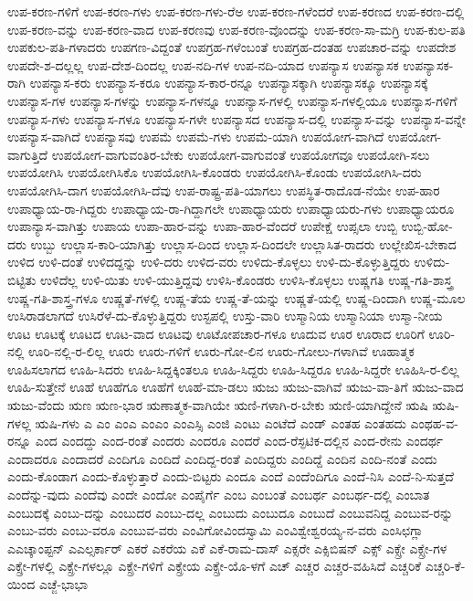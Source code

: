 {ಉಪ-ಕರಣ-ಗಳಿಗೆ
ಉಪ-ಕರಣ-ಗಳು
ಉಪ-ಕರಣ-ಗಳು-ರೆಅ
ಉಪ-ಕರಣ-ಗಳೆಂದರೆ
ಉಪ-ಕರಣದ
ಉಪ-ಕರಣ-ದಲ್ಲಿ
ಉಪ-ಕರಣ-ವನ್ನು
ಉಪ-ಕರಣ-ವಾದ
ಉಪ-ಕರಣವು
ಉಪ-ಕರಣ-ವೊಂದನ್ನು
ಉಪ-ಕರಣ-ಸಾ-ಮಗ್ರಿ
ಉಪ-ಕುಲ-ಪತಿ
ಉಪಕುಲ-ಪತಿ-ಗಳಾದರು
ಉಪಗಣ-ವಿದ್ದಂತೆ
ಉಪಗ್ರಹ-ಗಳೆಂಬಂತೆ
ಉಪಗ್ರಹ-ದಂತಹ
ಉಪಚಾರ-ವನ್ನು
ಉಪದೇಶ
ಉಪದೇ-ಶ-ದಲ್ಲಲ್ಲ
ಉಪ-ದೇಶ-ದಿಂದಲ್ಲ
ಉಪ-ನದಿ-ಗಳ
ಉಪ-ನದಿ-ಯಾದ
ಉಪನ್ಯಾಸ
ಉಪನ್ಯಾಸಕ
ಉಪನ್ಯಾಸಕ-ರಾಗಿ
ಉಪನ್ಯಾಸ-ಕರು
ಉಪನ್ಯಾಸ-ಕರೂ
ಉಪನ್ಯಾಸ-ಕಾರ-ರನ್ನೂ
ಉಪನ್ಯಾಸಕ್ಕಾಗಿ
ಉಪನ್ಯಾಸಕ್ಕೂ
ಉಪನ್ಯಾಸಕ್ಕೆ
ಉಪನ್ಯಾಸ-ಗಳ
ಉಪನ್ಯಾಸ-ಗಳನ್ನು
ಉಪನ್ಯಾಸ-ಗಳನ್ನೂ
ಉಪನ್ಯಾಸ-ಗಳಲ್ಲಿ
ಉಪನ್ಯಾಸ-ಗಳಲ್ಲಿಯೂ
ಉಪನ್ಯಾಸ-ಗಳಿಗೆ
ಉಪನ್ಯಾಸ-ಗಳು
ಉಪನ್ಯಾಸ-ಗಳೂ
ಉಪನ್ಯಾಸ-ಗಳೇ
ಉಪನ್ಯಾಸದ
ಉಪನ್ಯಾಸ-ದಲ್ಲಿ
ಉಪನ್ಯಾಸ-ವನ್ನು
ಉಪನ್ಯಾಸ-ವನ್ನೇ
ಉಪನ್ಯಾಸ-ವಾಗಿದೆ
ಉಪನ್ಯಾಸವು
ಉಪಮೆ
ಉಪಮೆ-ಗಳು
ಉಪಮೆ-ಯಾಗಿ
ಉಪಯೋಗ-ವಾಗಿದೆ
ಉಪಯೋಗ-ವಾಗುತ್ತಿದೆ
ಉಪಯೋಗ-ವಾಗುವಂತಿರ-ಬೇಕು
ಉಪಯೋಗ-ವಾಗುವಂತೆ
ಉಪಯೋಗವೂ
ಉಪಯೋಗಿ-ಸಲು
ಉಪಯೋಗಿಸಿ
ಉಪಯೋಗಿಸಿಕೊ
ಉಪಯೋಗಿಸಿ-ಕೊಂಡರು
ಉಪಯೋಗಿಸಿ-ಕೊಂಡು
ಉಪಯೋಗಿಸಿ-ದರು
ಉಪಯೋಗಿಸಿ-ದಾಗ
ಉಪಯೋಗಿಸಿ-ದೆವು
ಉಪ-ರಾಷ್ಟ್ರ-ಪತಿ-ಯಾಗಲು
ಉಪಸ್ಥಿತ-ರಾದೊಡ-ನೆಯೇ
ಉಪ-ಹಾರ
ಉಪಾಧ್ಯಾಯ-ರಾ-ಗಿದ್ದರು
ಉಪಾಧ್ಯಾಯ-ರಾ-ಗಿದ್ದಾಗಲೇ
ಉಪಾಧ್ಯಾಯರು
ಉಪಾಧ್ಯಾಯರು-ಗಳು
ಉಪಾಧ್ಯಾಯರೂ
ಉಪಾನ್ಯಾಸ-ವಾಗಿತ್ತು
ಉಪಾಯ
ಉಪಾ-ಹಾರ-ವನ್ನು
ಉಪಾ-ಹಾರ-ವೆಂದರೆ
ಉಪೇಕ್ಷೆ
ಉಪ್ಸಲಾ
ಉಬ್ಬಿ
ಉಬ್ಬಿ-ಹೋ-ದರು
ಉಬ್ಬು
ಉಲ್ಲಾಸ-ಕಾರಿ-ಯಾಗಿತ್ತು
ಉಲ್ಲಾಸ-ದಿಂದ
ಉಲ್ಲಾಸ-ದಿಂದಲೇ
ಉಲ್ಲಾಸಿತ-ರಾದರು
ಉಲ್ಲೇಖಿಸ-ಬೇಕಾದ
ಉಳಿದ
ಉಳಿ-ದಂತೆ
ಉಳಿದದ್ದನ್ನು
ಉಳಿ-ದರು
ಉಳಿದ-ವರು
ಉಳಿದು-ಕೊಳ್ಳಲು
ಉಳಿ-ದು-ಕೊಳ್ಳುತ್ತಿದ್ದರು
ಉಳಿದು-ಬಿಟ್ಟಿತು
ಉಳಿದೆಲ್ಲ
ಉಳಿ-ಯಿತು
ಉಳಿ-ಯುತ್ತಿದ್ದವು
ಉಳಿಸಿ-ಕೊಂಡರು
ಉಳಿಸಿ-ಕೊಳ್ಳಲು
ಉಷ್ಣಗತಿ
ಉಷ್ಣ-ಗತಿ-ಶಾಸ್ತ್ರ
ಉಷ್ಣ-ಗತಿ-ಶಾಸ್ತ್ರ-ಗಳೂ
ಉಷ್ಣತೆ-ಗಳಲ್ಲಿ
ಉಷ್ಣ-ತೆಯ
ಉಷ್ಣ-ತೆ-ಯನ್ನು
ಉಷ್ಣತೆ-ಯಲ್ಲಿ
ಉಷ್ಣ-ದಿಂದಾಗಿ
ಉಷ್ಣ-ಮೂಲ
ಉಸಿರಾಡಲಾಗದೆ
ಉಸಿರೆಳೆ-ದು-ಕೊಳ್ಳುತ್ತಿದ್ದರು
ಉಸ್ಟಪಲ್ಲಿ
ಉಸ್ತು-ವಾರಿ
ಉಸ್ಮಾನಿಯ
ಉಸ್ಮಾನಿಯಾ
ಉಸ್ಮಾ-ನೀಯ
ಊಟ
ಊಟಕ್ಕೆ
ಊಟದ
ಊಟ-ವಾದ
ಊಟವು
ಊಟೋಪಚಾರ-ಗಳೂ
ಊದುವ
ಊರ
ಊರಾದ
ಊರಿಗೆ
ಊರಿ-ನಲ್ಲಿ
ಊರಿ-ನಲ್ಲಿ-ರ-ಲಿಲ್ಲ
ಊರು
ಊರು-ಗಳಿಗೆ
ಊರು-ಗೋ-ಲಿನ
ಊರು-ಗೋಲು-ಗಳಾಗಿವೆ
ಊಹಾತ್ಮಕ
ಊಹಿಸಲಾಗದ
ಊಹಿ-ಸಿದರು
ಊಹಿ-ಸಿದ್ದಕ್ಕಿಂತಲೂ
ಊಹಿ-ಸಿದ್ದರು
ಊಹಿ-ಸಿದ್ದರೂ
ಊಹಿ-ಸಿದ್ದರೇ
ಊಹಿಸಿ-ರ-ಲಿಲ್ಲ
ಊಹಿ-ಸುತ್ತೇನೆ
ಊಹೆ
ಊಹೆಗೂ
ಊಹೆಗೆ
ಊಹೆ-ಮಾ-ಡಲು
ಋಜು
ಋಜು-ವಾಗಿವೆ
ಋಜು-ವಾ-ತಿಗೆ
ಋಜು-ವಾದ
ಋಜು-ವೆಂದು
ಋಣ
ಋಣ-ಭಾರ
ಋಣಾತ್ಮಕ-ವಾಗಿಯೇ
ಋಣಿ-ಗಳಾಗಿ-ರ-ಬೇಕು
ಋಣಿ-ಯಾಗಿದ್ದೇನೆ
ಋಷಿ
ಋಷಿ-ಗಳಲ್ಲ
ಋಷಿ-ಗಳು
ಎ
ಎಂ
ಎಂಎ
ಎಂಎಂ
ಎಂಎಸ್ಸಿ
ಎಂಜಿ
ಎಂಟು
ಎಂಟೆದೆ
ಎಂಡ್
ಎಂತಹ
ಎಂತಹದು
ಎಂಥಹ-ವ-ರನ್ನೂ
ಎಂದ
ಎಂದದ್ದು
ಎಂದ-ರಂತೆ
ಎಂದರು
ಎಂದರೂ
ಎಂದರೆ
ಎಂದ-ರೆಸ್ಫಟಿಕ-ದಲ್ಲಿನ
ಎಂದ-ರೇನು
ಎಂದರ್ಥ
ಎಂದಾದರೂ
ಎಂದಾದರೆ
ಎಂದಿಗೂ
ಎಂದಿದೆ
ಎಂದಿದ್ದ-ರಂತೆ
ಎಂದಿದ್ದರು
ಎಂದಿದ್ದೆ
ಎಂದಿನ
ಎಂದಿ-ನಂತೆ
ಎಂದು
ಎಂದು-ಕೊಂಡಾಗ
ಎಂದು-ಕೊಳ್ಳುತ್ತಾರೆ
ಎಂದು-ಬಿಟ್ಟರು
ಎಂದೂ
ಎಂದೆ
ಎಂದೆಂದಿಗೂ
ಎಂದೆ-ನಿಸಿ
ಎಂದೆ-ನಿ-ಸುತ್ತದೆ
ಎಂದೆನ್ನು-ವುದು
ಎಂದೆವು
ಎಂದೇ
ಎಂದೋ
ಎಂಪೈರ್ಗೆ
ಎಂಬ
ಎಂಬಂತೆ
ಎಂಬರ್ಥ
ಎಂಬರ್ಥ-ದಲ್ಲಿ
ಎಂಬಾತ
ಎಂಬುದಕ್ಕೆ
ಎಂಬು-ದನ್ನು
ಎಂಬುದರ
ಎಂಬು-ದಲ್ಲ
ಎಂಬುದು
ಎಂಬುದೂ
ಎಂಬುದೆ
ಎಂಬುವನಿದ್ದ
ಎಂಬುವ-ರನ್ನು
ಎಂಬು-ವರು
ಎಂಬು-ವರೂ
ಎಂಬುವ-ವರು
ಎಂವಿಗೋವಿಂದಸ್ವಾಮಿ
ಎಂವಿಶ್ವೇಶ್ವರಯ್ಯ-ನ-ವರು
ಎಂಸಿಛಗ್ಲಾ
ಎಎಚ್ಕಾಂಪ್ಟನ್
ಎಎಲ್ಸರ್ಕಾರ್
ಎಕರೆ
ಎಕರೆಯ
ಎಕೆ
ಎಕೆ-ರಾಮ-ದಾಸ್
ಎಕ್ಸರೇ
ಎಕ್ಸಿಬಿಷನ್
ಎಕ್ಸ್
ಎಕ್ಸ್ರೇ
ಎಕ್ಸ್ರೇ-ಗಳ
ಎಕ್ಸ್ರೇ-ಗಳಲ್ಲಿ
ಎಕ್ಸ್ರೇ-ಗಳಲ್ಲೂ
ಎಕ್ಸ್ರೇ-ಗಳಿಗೆ
ಎಕ್ಸ್ರೇಯ
ಎಕ್ಸ್ರೇ-ಯೊ-ಳಗೆ
ಎಚ್
ಎಚ್ಚರ
ಎಚ್ಚರ-ವಹಿಸಿದೆ
ಎಚ್ಚರಿಕೆ
ಎಚ್ಚರಿ-ಕೆ-ಯಿಂದ
ಎಚ್ಜೆ-ಭಾಭಾ
}
